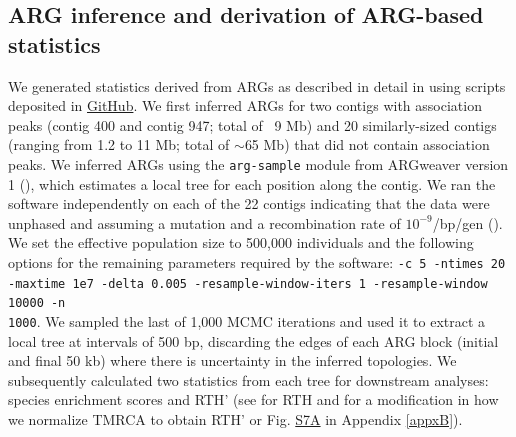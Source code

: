 \subsection{\ac{ARG} inference and derivation of \ac{ARG}-based statistics}
We generated statistics derived from \acp{ARG} as described in detail in \cite{hejase_genomic_2020} using scripts deposited in \href{https://github.com/CshlSiepelLab/bird_capuchino_analysis}{GitHub}. We first inferred \acp{ARG} for two contigs with association peaks (contig 400 and contig 947; total of ~9 Mb) and 20 similarly-sized contigs (ranging from 1.2 to 11 Mb; total of $\sim$65 Mb) that did not contain association peaks. We inferred \acp{ARG} using the \texttt{arg-sample} module from ARGweaver version 1 (\cite{rasmussen_genome-wide_2014}), which estimates a local tree for each position along the contig. We ran the software independently on each of the 22 contigs indicating that the data were unphased and assuming a mutation and a recombination rate of $10^{-9}$/bp/gen (\cite{hejase_genomic_2020,smeds2016direct}). We set the effective population size to 500,000 individuals and the following options for the remaining parameters required by the software: \texttt{-c 5 -ntimes 20 -maxtime 1e7 -delta 0.005 -resample-window-iters 1 -resample-window 10000 -n\\ 1000}. We sampled the last of 1,000 \acs{MCMC} iterations and used it to extract a local tree at intervals of 500 bp, discarding the edges of each \ac{ARG} block (initial and final 50 kb) where there is uncertainty in the inferred topologies. We subsequently calculated two statistics from each tree for downstream analyses: species enrichment scores and \acs{RTH}’ (see \cite{rasmussen_genome-wide_2014} for \acs{RTH} and \cite{hejase_genomic_2020} for a modification in how we normalize \ac{TMRCA} to obtain \acs{RTH}’ or Fig. \href{https://journals.plos.org/PLOSGENETICS/article?id=10.1371/journal.pgen.1010474#sec017}{S7A} in Appendix \ref{appxB}).

